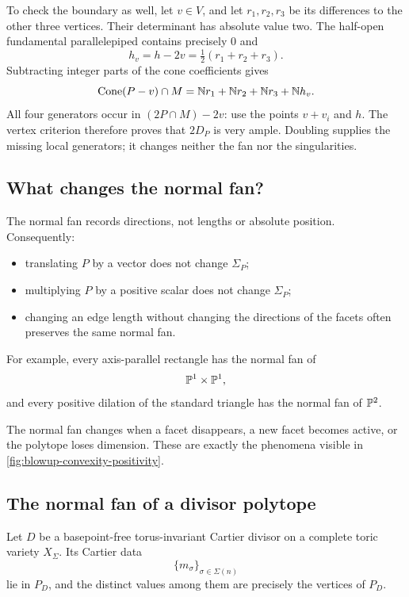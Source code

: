 \begin{example}
To check the boundary as well, let \(v\in V\), and let
\(r_1,r_2,r_3\) be its differences to the other three vertices. Their
determinant has absolute value two. The half-open fundamental
parallelepiped contains precisely \(0\) and
\[
h_v=h-2v=\tfrac12(r_1+r_2+r_3).
\]
Subtracting integer parts of the cone coefficients gives
\[
\operatorname{Cone}(P-v)\cap M
=\mathbb{N} r_1+\mathbb{N} r_2+\mathbb{N} r_3+\mathbb{N} h_v.
\]
All four generators occur in \((2P\cap M)-2v\): use the points
\(v+v_i\) and \(h\). The vertex criterion therefore proves that
\(2D_P\) is very ample. Doubling supplies the missing local
generators; it changes neither the fan nor the singularities.
\end{example}

\subsection{What changes the normal fan?}

The normal fan records directions, not lengths or absolute position.
Consequently:

\begin{itemize}
\item translating \(P\) by a vector does not change \(\Sigma_P\);

\item multiplying \(P\) by a positive scalar does not change
\(\Sigma_P\);

\item changing an edge length without changing the directions of the
facets often preserves the same normal fan.
\end{itemize}

For example, every axis-parallel rectangle has the normal fan of
\[
\mathbb{P}^1\times\mathbb{P}^1,
\]
and every positive dilation of the standard triangle has the normal
fan of \(\mathbb{P}^2\).

The normal fan changes when a facet disappears, a new facet becomes
active, or the polytope loses dimension. These are exactly the
phenomena visible in \cref{fig:blowup-convexity-positivity}.

\subsection{The normal fan of a divisor polytope}

Let \(D\) be a basepoint-free torus-invariant Cartier divisor on a
complete toric variety \(X_\Sigma\). Its Cartier data
\[
\{m_\sigma\}_{\sigma\in\Sigma(n)}
\]
lie in \(P_D\), and the distinct values among them are precisely the
vertices of \(P_D\).

